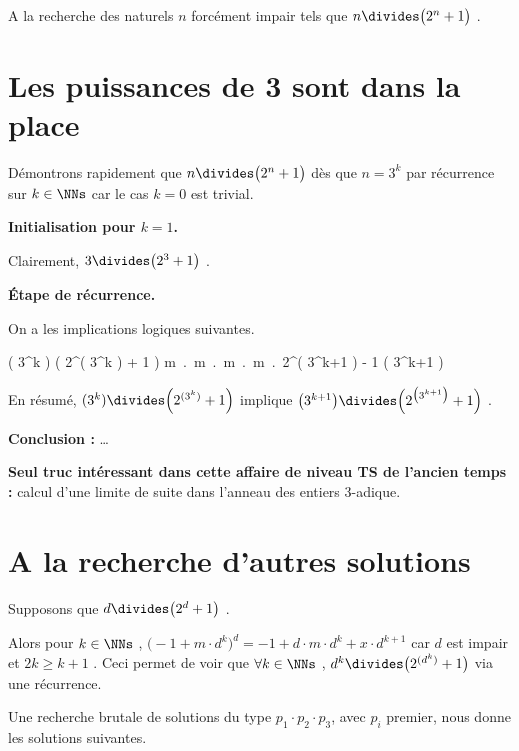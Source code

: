 \documentclass[12pt]{article}
\begin{document}
A la recherche des naturels $n$ forcément impair tels que $n \divides \big( 2^n + 1 \big)$ .


\section{Les puissances de 3 sont dans la place}

Démontrons rapidement que $n \divides \big( 2^n + 1 \big)$ dès que $n = 3^k$ par récurrence sur $k \in \NNs$ car le cas $k = 0$ est trivial.

\bigskip

\textbf{Initialisation pour $k = 1$.}

\smallskip

Clairement, $3 \divides \big( 2^3 + 1 \big)$ .

\bigskip

\textbf{Étape de récurrence.}

\smallskip

On a les implications logiques suivantes.

\medskip

\begin{stepcalc}[style=ar*, ope=\implies]
	( 3^k ) \divides \Big( 2^{( 3^k )} + 1 \Big)
\explnext{}
	\exists m \in \ZZ \,.\, \Big[ 2^{( 3^k )} + 1 = m \cdot 3^k  \Big]
\explnext{}
	\exists m \in \ZZ \,.\, \Big[ 2^{( 3^k )} = - 1 + m \cdot 3^k  \Big]
\explnext{}
	\exists m \in \ZZ \,.\, \Big[ \left( 2^{( 3^k )} \right)^3 = \big( - 1 + m \cdot 3^k \big)^3  \Big]
\explnext{}
	\exists m \in \ZZ \,.\, \Big[ 2^{\big( 3^{k+1} \big)} = - 1 + 3 \cdot m \cdot 3^k - 3 \cdot \big( m \cdot 3^k \big)^2 + \big( m \cdot 3^k \big)^3  \Big]
	2^{\big( 3^{k+1} \big)} \equiv - 1 \mod\!\big( 3^{k+1} \big)
\end{stepcalc}

\smallskip

En résumé, 
$( 3^k ) \divides \Big( 2^{( 3^k )} + 1 \Big)$ 
implique
$\big( 3^{k+1} \big) \divides \Big( 2^{\big( 3^{k+1} \big)} + 1 \Big)$  .

\bigskip

\textbf{Conclusion :} \dots

\bigskip

\textbf{Seul truc intéressant dans cette affaire de niveau TS de l'ancien temps :} calcul d'une limite de suite dans l'anneau des entiers $3$-adique.


\section{A la recherche d'autres solutions}

Supposons que $d \divides \big( 2^d + 1 \big)$ .

Alors pour $k \in \NNs$ , 
$\big( - 1 + m \cdot d^k \big)^d = - 1 + d \cdot m \cdot d^k + x \cdot d^{k+1}$ car $d$ est impair et $2k \geq k + 1$ .
Ceci permet de voir que $\forall k \in \NNs$ , $d^k \divides \big( 2^{( d^k )} + 1 \big)$ via une récurrence.


\bigskip

Une recherche brutale de solutions du type $p_1 \cdot p_2 \cdot p_3$, avec $p_i$ premier, nous donne les solutions suivantes.
\end{document}
